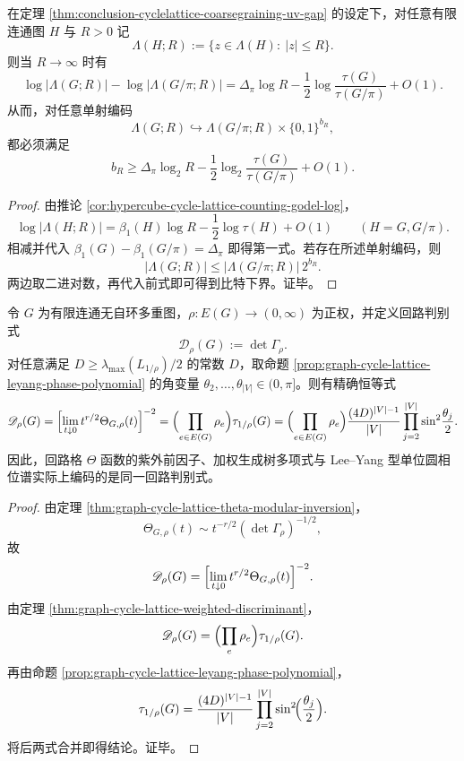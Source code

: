 \begin{corollary}\label{cor:conclusion-cyclelattice-coarsegraining-godel-bit-tax}
在定理 \ref{thm:conclusion-cyclelattice-coarsegraining-uv-gap} 的设定下，对任意有限连通图 \(H\) 与 \(R>0\) 记
\[
\Lambda(H;R):=\{z\in\Lambda(H):\ |z|\le R\}.
\]
则当 \(R\to\infty\) 时有
\[
\log |\Lambda(G;R)|-\log |\Lambda(G/\pi;R)|
=
\Delta_\pi\log R
-\frac12\log\frac{\tau(G)}{\tau(G/\pi)}
+O(1).
\]
从而，对任意单射编码
\[
\Lambda(G;R)\hookrightarrow \Lambda(G/\pi;R)\times \{0,1\}^{b_R},
\]
都必须满足
\[
b_R
\ge
\Delta_\pi\log_2 R
-\frac12\log_2\frac{\tau(G)}{\tau(G/\pi)}
+O(1).
\]
\end{corollary}
\begin{proof}
由推论 \ref{cor:hypercube-cycle-lattice-counting-godel-log}，
\[
\log |\Lambda(H;R)|
=
\beta_1(H)\log R-\frac12\log\tau(H)+O(1)
\qquad(H=G,G/\pi).
\]
相减并代入
\(
\beta_1(G)-\beta_1(G/\pi)=\Delta_\pi
\)
即得第一式。若存在所述单射编码，则
\[
|\Lambda(G;R)|\le |\Lambda(G/\pi;R)|\,2^{b_R}.
\]
两边取二进对数，再代入前式即可得到比特下界。证毕。
\end{proof}

\begin{theorem}[回路判别式的三重统一]\label{thm:conclusion-cyclelattice-discriminant-triple-unity}
令 \(G\) 为有限连通无自环多重图，\(\rho:E(G)\to(0,\infty)\) 为正权，并定义回路判别式
\[
\mathscr D_\rho(G):=\det\Gamma_\rho.
\]
对任意满足 \(D\ge \lambda_{\max}(L_{1/\rho})/2\) 的常数 \(D\)，取命题 \ref{prop:graph-cycle-lattice-leyang-phase-polynomial} 的角变量 \(\theta_2,\dots,\theta_{|V|}\in(0,\pi]\)。则有精确恒等式
\[
\mathscr D_\rho(G)
=
\Bigl[\lim_{t\downarrow0} t^{r/2}\Theta_{G,\rho}(t)\Bigr]^{-2}
=
\Bigl(\prod_{e\in E(G)}\rho_e\Bigr)\tau_{1/\rho}(G)
=
\Bigl(\prod_{e\in E(G)}\rho_e\Bigr)\frac{(4D)^{|V|-1}}{|V|}
\prod_{j=2}^{|V|}\sin^2\!\frac{\theta_j}{2}.
\]
因此，回路格 \(\Theta\) 函数的紫外前因子、加权生成树多项式与 Lee--Yang 型单位圆相位谱实际上编码的是同一回路判别式。
\end{theorem}
\begin{proof}
由定理 \ref{thm:graph-cycle-lattice-theta-modular-inversion}，
\[
\Theta_{G,\rho}(t)\sim t^{-r/2}(\det\Gamma_\rho)^{-1/2},
\]
故
\[
\mathscr D_\rho(G)
=
\Bigl[\lim_{t\downarrow0} t^{r/2}\Theta_{G,\rho}(t)\Bigr]^{-2}.
\]
由定理 \ref{thm:graph-cycle-lattice-weighted-discriminant}，
\[
\mathscr D_\rho(G)=\Bigl(\prod_e\rho_e\Bigr)\tau_{1/\rho}(G).
\]
再由命题 \ref{prop:graph-cycle-lattice-leyang-phase-polynomial}，
\[
\tau_{1/\rho}(G)
=
\frac{(4D)^{|V|-1}}{|V|}\prod_{j=2}^{|V|}\sin^2\!\Bigl(\frac{\theta_j}{2}\Bigr).
\]
将后两式合并即得结论。证毕。
\end{proof}

